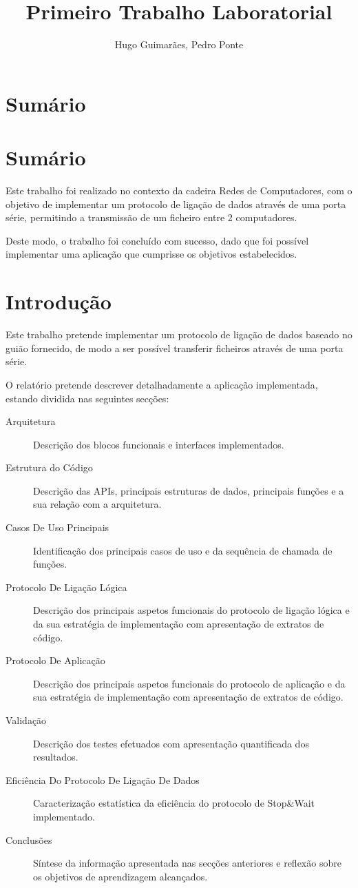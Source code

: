 \documentclass[11pt]{article}
\author{Hugo Guimarães, Pedro Ponte}
\title{Primeiro Trabalho Laboratorial}
\begin{document}
\maketitle 
\pagebreak
\tableofcontents

\pagebreak
\section*{Sumário}

\section*{Sumário}

Este trabalho foi realizado no contexto da cadeira Redes de Computadores, com o objetivo de implementar um protocolo de  ligação de dados através de uma porta série, permitindo a transmissão de um ficheiro entre 2 computadores.
 
Deste modo, o trabalho foi concluído com sucesso, dado que foi possível implementar uma aplicação que cumprisse os objetivos estabelecidos.


\section{Introdução}
Este trabalho pretende implementar um protocolo de ligação de dados baseado no guião fornecido, de modo a ser possível transferir ficheiros através de uma porta série.

O relatório pretende descrever detalhadamente a aplicação implementada, estando dividida nas seguintes secções:
\begin{description}
	\item[Arquitetura] Descrição dos blocos funcionais e interfaces implementados.
	\item[Estrutura do Código] Descrição das APIs, principais estruturas de dados, principais funções e a sua relação com a arquitetura.
	\item[Casos De Uso Principais] Identificação dos principais casos de uso e da sequência de chamada de funções.
	\item[Protocolo De Ligação Lógica] Descrição dos principais aspetos funcionais do protocolo de ligação lógica e da sua estratégia de implementação com apresentação de extratos de código.
	\item[Protocolo De Aplicação] Descrição dos principais aspetos funcionais do protocolo de aplicação e da sua estratégia de implementação com apresentação de extratos de código.
	\item[Validação] Descrição dos testes efetuados com apresentação quantificada dos resultados.
	\item[Eficiência Do Protocolo De Ligação De Dados] Caracterização estatística da eficiência do protocolo de Stop\&Wait implementado.
	\item[Conclusões] Síntese da informação apresentada nas secções anteriores e reflexão sobre os objetivos de aprendizagem alcançados.
\end{description}
\end{document}

